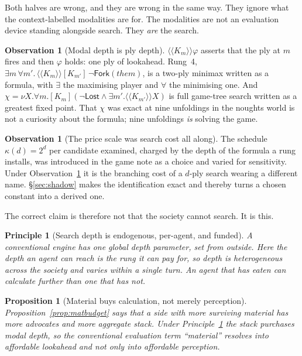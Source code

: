 \documentclass[11pt,a4paper]{article}
\theoremstyle{plain}
\newtheorem{proposition}[theorem]{Proposition}
\newtheorem{principle}[theorem]{Principle}
\theoremstyle{definition}
\newtheorem{observation}[theorem]{Observation}
\theoremstyle{remark}
\newcommand{\KKmod}[1]{\langle\!\langle K_{#1}\rangle\!\rangle}
\newcommand{\Bmod}[1]{[K_{#1}]}
\begin{document}
Both halves are wrong, and they are wrong in the same way. They ignore what the
context-labelled modalities are for. The modalities are not an evaluation device
standing alongside search. They \emph{are} the search.

\begin{observation}[Modal depth is ply depth]
\label{obs:depth}
$\KKmod{m}\varphi$ asserts that the ply at $m$ fires and then $\varphi$ holds:
one ply of lookahead. Rung~4,
$\exists m\,\forall m'.\,\KKmod{m}\Bmod{m'}\,\neg\mathsf{Fork}(\mathit{them})$,
is a two-ply minimax written as a formula, with $\exists$ the maximising player
and $\forall$ the minimising one. And
$\chi = \nu X.\forall m.\Bmod{m}(\neg\mathsf{Lost} \wedge \exists
m'.\KKmod{m'}X)$
is full game-tree search written as a greatest fixed point. That $\chi$ was
exact at nine unfoldings in the noughts world is not a curiosity about the
formula; nine unfoldings \emph{is} solving the game.
\end{observation}

\begin{observation}[The price scale was search cost all along]
\label{obs:price}
The schedule $\kappa(d) = 2^d$ per candidate examined, charged by the depth of
the formula a rung installs, was introduced in the game note as a choice and
varied for sensitivity. Under Observation~\ref{obs:depth} it is the branching
cost of a $d$-ply search wearing a different name. \S\ref{sec:shadow} makes the
identification exact and thereby turns a chosen constant into a derived one.
\end{observation}

The correct claim is therefore not that the society cannot search. It is this.

\begin{principle}[Search depth is endogenous, per-agent, and funded]
\label{prin:endog}
A conventional engine has one global depth parameter, set from outside. Here the
depth an agent can reach is the rung it can pay for, so depth is heterogeneous
across the society and varies within a single turn. An agent that has eaten can
calculate further than one that has not.
\end{principle}

\begin{proposition}[Material buys calculation, not merely perception]
\label{prop:matdepth}
Proposition~\ref{prop:matbudget} says that a side with more surviving material
has more advocates and more aggregate stack. Under
Principle~\ref{prin:endog} the stack purchases modal depth, so the conventional
evaluation term ``material'' resolves into affordable lookahead and not only
into affordable perception.
\end{proposition}
\end{document}
